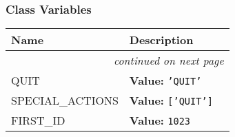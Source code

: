 
  \subsubsection{Class Variables}

    \vspace{-1cm}
\hspace{\varindent}\begin{longtable}{|p{\varnamewidth}|p{\vardescrwidth}|l}
\cline{1-2}
\cline{1-2} \centering \textbf{Name} & \centering \textbf{Description}& \\
\cline{1-2}
\endhead\cline{1-2}\multicolumn{3}{r}{\small\textit{continued on next page}}\\\endfoot\cline{1-2}
\endlastfoot\raggedright Q\-U\-I\-T\- & \raggedright \textbf{Value:} 
{\tt \texttt{'}\texttt{QUIT}\texttt{'}}&\\
\cline{1-2}
\raggedright S\-P\-E\-C\-I\-A\-L\-\_\-A\-C\-T\-I\-O\-N\-S\- & \raggedright \textbf{Value:} 
{\tt \texttt{[}\texttt{'}\texttt{QUIT}\texttt{'}\texttt{]}}&\\
\cline{1-2}
\raggedright F\-I\-R\-S\-T\-\_\-I\-D\- & \raggedright \textbf{Value:} 
{\tt 1023}&\\
\cline{1-2}
\end{longtable}

